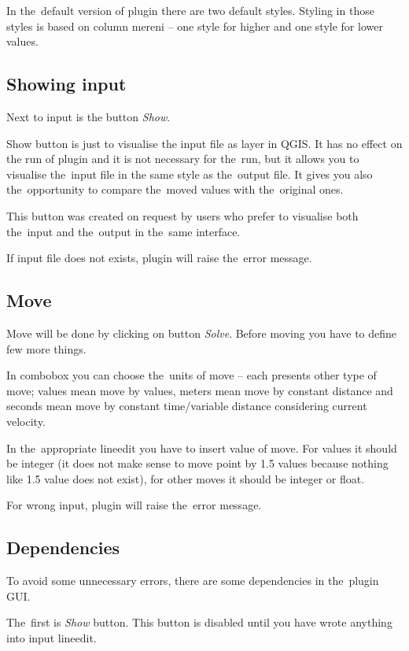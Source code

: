 In the~default version of plugin there are two default styles. Styling in those styles is based on
column mereni – one style for higher and one style for lower values. 

\subsection{Showing input}
\label{show}

Next to input is the button \textit{Show}. 

Show button is just to visualise the input file as layer in QGIS. It has no effect on the run of plugin
and it is not necessary for the~run, but it allows you to visualise the~input file in the same style as
the~output file. It gives you also the~opportunity to compare the~moved values with the~original ones. 

This button was created on request by users who prefer to visualise both the~input and the~output in
the~same interface. 

If input file does not exists, plugin will raise the~error message. 

\subsection{Move}
\label{move}

Move will be done by clicking on button \textit{Solve}. Before moving you have to define few more things. 

In combobox you can choose the~units of move – each presents other type of move; values mean move
by values, meters mean move by constant distance and seconds mean move by constant time/variable
distance considering current velocity. 

In the~appropriate lineedit you have to insert value of move. For values it should be integer (it
does not make sense to move point by 1.5 values because nothing like 1.5 value does not exist), for
other moves it should be integer or float. 

For wrong input, plugin will raise the~error message. 

\subsection{Dependencies}
\label{dependencies}

To avoid some unnecessary errors, there are some dependencies in the~plugin GUI. 

The~first is \textit{Show} button. This button is
disabled until you have wrote anything into input lineedit. 

